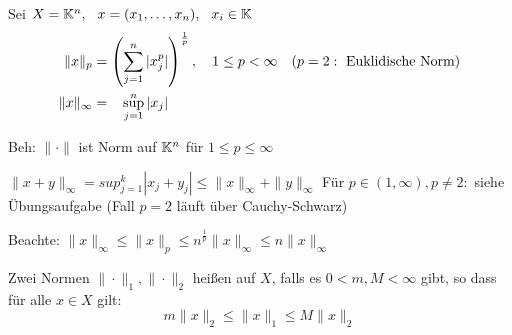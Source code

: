 \begin{beispiel}
Sei $ X = \mathbb{K}^{n}, \hspace{0.25cm} x = ( x_{1}, \dotsc, x_{n}), \hspace{0.25cm} x_{i} \in \mathbb{K}$ 
\begin{align*}
	\| x \|_{p} & = \left( \sum_{j = 1}^{n} |x_{j}^{p}| \right)^{\frac{1}{p}}, \quad 1 \leq p < \infty \quad (p = 2: \text{ Euklidische Norm}) \\
	\| x \|_{\infty} & = \hspace{0.3cm} \sup_{j = 1}^{n} |x_{j}|	
\end{align*}

Beh: $\| \cdot \| $ ist Norm auf $\mathbb{K}^n$ für $1 \leq p \leq \infty$

$\| x + y \|_{\infty} = sup_{j = 1}^{k} |x_{j} + y_{j}| \leq \|x\|_{\infty} + \|y\|_{\infty} $
Für $p \in (1, \infty), p \neq 2:$ siehe Übungsaufgabe (Fall $p = 2$ läuft über Cauchy-Schwarz)

Beachte: $\|x\|_{\infty} \leq  \|x\|_{p} \leq n^{\frac{1}{p}} \|x\|_{\infty} \leq n \| x \|_{\infty}$
\end{beispiel}

\begin{definition}
	Zwei Normen $\| \cdot \|_{1}, \| \cdot \|_{2}$ hei{\ss}en  auf $X$, falls es $0 < m, M < \infty$ gibt, so dass für alle $ x \in X$ gilt:
	\[ m \| x \|_{2} \leq \| x \|_{1} \leq M \| x \|_{2} \]
\end{definition}
 
